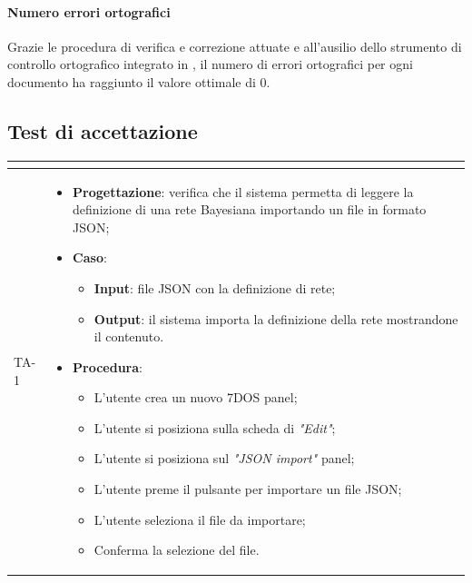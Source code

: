 \paragraph{Numero errori ortografici} \Spazio
Grazie le procedura di verifica e correzione attuate e all'ausilio dello strumento di controllo ortografico integrato in , il numero di errori ortografici per ogni documento ha raggiunto il valore ottimale di 0.

\subsection{Test di accettazione}
\normalsize
\renewcommand{\arraystretch}{1}
\begin{longtable}{|C{2.5cm}|C{13cm}|}
	\hline
	\textbf{\color{title_text}{Test}} & \textbf{\color{title_text}{Specifica}}  \\
	\hline
	\endhead
{TA-1} &
\begin{itemize}
	\item \textbf{Progettazione}: verifica che il sistema permetta di leggere la definizione di una rete Bayesiana importando un file in formato JSON;
	\item \textbf{Caso}: 
		\begin{itemize}
			\item \textbf{Input}: file JSON con la definizione di rete;
			\item \textbf{Output}: il sistema importa la definizione della rete mostrandone il contenuto.
		\end{itemize}
	\item \textbf{Procedura}:
		\begin{itemize}
			\item L'utente crea un nuovo 7DOS panel;
			\item L'utente si posiziona sulla scheda di \emph{"Edit"};
			\item L'utente si posiziona sul \emph{"JSON import"} panel;
			\item L'utente preme il pulsante per importare un file JSON;
			\item L'utente seleziona il file da importare;
			\item Conferma la selezione del file.
		\end{itemize} 
\end{itemize} \\
\hline


\end{longtable}
